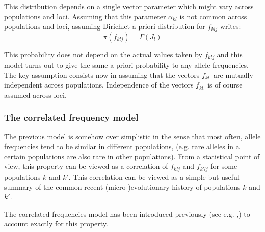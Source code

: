 \documentclass[a4paper,10pt]{article}
\begin{document}
This distribution depends on a single vector parameter which might vary across populations and loci. 
Assuming that this parameter $\alpha_{kl}$ is not common across 
populations and loci, assuming Dirichlet a priori distribution for $f_{klj}$ writes:
 \begin{equation}\label{eq:UFM}
\pi(f_{klj}) = \Gamma(J_l)
\end{equation}

This probability does not depend on the actual values taken by $f_{klj}$ and this model turns out to give the same 
a priori probability to any allele frequencies. 
The key assumption consists now in assuming that the vectors $f_{kl.}$ are mutually independent across populations. 
Independence  of the vectors $f_{kl.}$ is of course assumed across loci.




\subsubsection{The correlated frequency model}

The previous model is somehow over simplistic in the sense that most often, allele frequencies tend to be 
similar in different populations, 
(e.g. rare alleles  in a certain populations are also rare in other 
populations). From a statistical point of view, this property can be viewed as a correlation of $f_{klj}$ and $f_{k'lj}$ 
for some populations $k$ and $k'$.
This correlation can be viewed as a simple but useful summary of the common recent (micro-)evolutionary history of populations $k$ and $k'$.


The correlated frequencies model has been introduced previously 
(see e.g. \citep{Balding03},\citep{Nicholson02})  to account exactly for this property.
\end{document}
